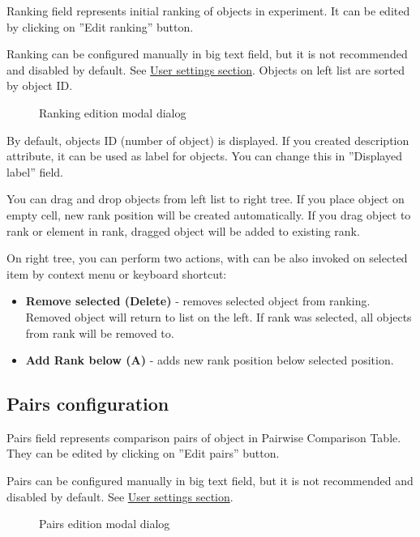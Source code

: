 Ranking field represents initial ranking of objects in experiment. It can be edited by clicking on ''Edit ranking'' button.

Ranking can be configured manually in big text field, but it is not recommended and disabled by default. See \hyperref[section:user-settings]{User settings section}. Objects on left list are sorted by object ID.

\begin{figure*}[!ht] 
	\centering
	\caption{Ranking edition modal dialog}
\end{figure*}

By default, objects ID (number of object) is displayed. If you created description attribute, it can be used as label for objects. You can change this in ''Displayed label'' field.

You can drag and drop objects from left list to right tree. If you place object on empty cell, new rank position will be created automatically. If you drag object to rank or element in rank, dragged object will be added to existing rank.

On right tree, you can perform two actions, with can be also invoked on selected item by context menu or keyboard shortcut:
\begin{itemize}
	\item \textbf{Remove selected (Delete)} - removes selected object from ranking. Removed object will return to list on the left. If rank was selected, all objects from rank will be removed to.
	\item \textbf{Add Rank below (A)} - adds new rank position below selected position.
\end{itemize}


\subsection{Pairs configuration}\label{sub:properties-pairs}

Pairs field represents comparison pairs of object in Pairwise Comparison Table. They can be edited by clicking on ''Edit pairs'' button.

Pairs can be configured manually in big text field, but it is not recommended and disabled by default. See \hyperref[section:user-settings]{User settings section}.

\begin{figure*}[!ht] 
	\centering
	\caption{Pairs edition modal dialog}
\end{figure*}

